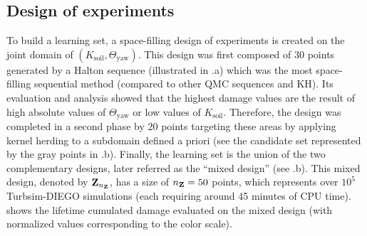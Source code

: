 \subsection{Design of experiments}
To build a learning set, a space-filling design of experiments is created on the joint domain of $(K_{\mathrm{soil}}, \Theta_{\mathrm{yaw}})$. 
This design was first composed of 30 points generated by a Halton sequence (illustrated in .a) which was the most space-filling sequential method (compared to other QMC sequences and KH). 
Its evaluation and analysis showed that the highest damage values are the result of high absolute values of $\Theta_{\mathrm{yaw}}$ or low values of $K_{\mathrm{soil}}$. 
Therefore, the design was completed in a second phase by 20 points targeting these areas by applying kernel herding to a subdomain defined a priori (see the candidate set represented by the gray points in .b). 
Finally, the learning set is the union of the two complementary designs, later referred as the ``mixed design'' (see .b). 
This mixed design, denoted by ${\bf Z}_{n_{\bf Z}}$, has a size of $n_{\bf Z}=50$ points, which represents over $10^5$ Turbsim-DIEGO simulations (each requiring around 45 minutes of CPU time).
 shows the lifetime cumulated damage evaluated on the mixed design (with normalized values corresponding to the color scale). 




